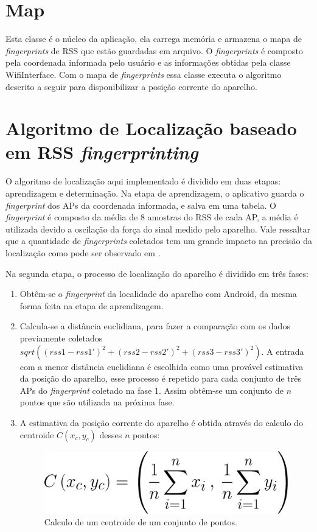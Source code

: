   \section{Map}
  Esta classe é o núcleo da aplicação, ela carrega memória e armazena o mapa de \textit{fingerprints} de RSS que estão 
  guardadas em arquivo. 
  O \textit{fingerprints} é composto 
  pela coordenada informada pelo usuário e as informações obtidas pela classe WifiInterface. 
  Com o mapa de \textit{fingerprints} essa classe executa o algoritmo descrito a seguir para disponibilizar 
  a posição corrente do aparelho.
   
  \section{Algoritmo de Localização baseado em RSS \textit{fingerprinting}}
  
  O algoritmo de localização aqui implementado é dividido em duas etapas: aprendizagem e determinação. Na etapa de aprendizagem, 
  o aplicativo guarda o \textit{fingerprint} dos APs da coordenada informada,
  e salva em uma tabela. O \textit{fingerprint} é composto da média de 8 amostras do RSS de cada AP, a média é utilizada 
  devido a oscilação da força do sinal medido pelo aparelho. Vale ressaltar que a quantidade de \textit{fingerprints} coletados tem um grande 
  impacto na precisão da localização como pode ser observado em \cite{wifiRadar}.  
  
  Na segunda etapa, o processo de localização do aparelho é dividido em três fases:
  \begin{enumerate}
   \item Obtêm-se o \textit{fingerprint} da localidade
  do aparelho com Android, da mesma forma feita na etapa de aprendizagem.
  \item Calcula-se a distância euclidiana, para fazer a comparação com os 
  dados previamente coletados $sqrt((rss1-rss1')^{2}+(rss2-rss2')^{2}+(rss3-rss3')^{2})$.
  A entrada com a menor distância euclidiana é escolhida como uma provável estimativa da
  posição do aparelho, esse processo é repetido para cada conjunto de três APs do \textit{fingerprint} coletado na fase 1. 
 Assim obtêm-se um conjunto de $n$ pontos que são utilizada na próxima fase. 
 \item A estimativa da posição corrente do aparelho é obtida através do calculo do centroide $C(x_c,y_c)$ desses $n$ pontos:
  \begin{figure}[hbt]
  \centering
  \includegraphics[scale=0.23]{images/centroid.png}
  \caption{Calculo de um centroide de um conjunto de pontos.}
  \label{fig:centroidFormula}
  \end{figure}
  \end{enumerate}
   
